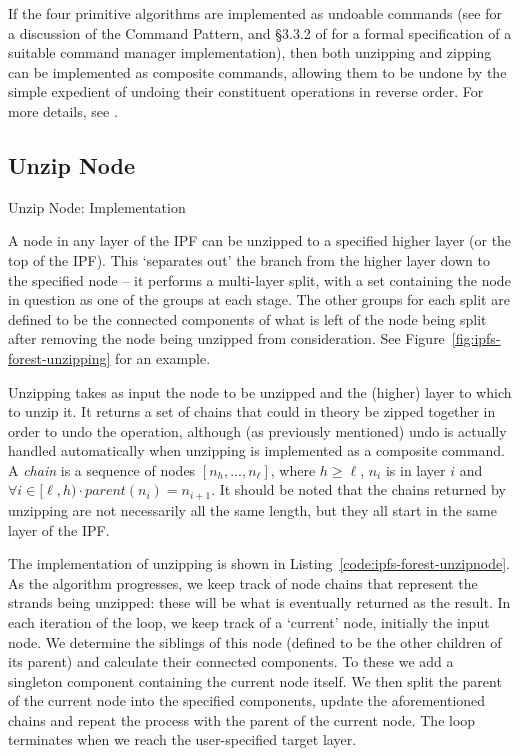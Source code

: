 \documentclass[10pt,twocolumn,twoside]{IEEEtran}
\begin{document}
If the four primitive algorithms are implemented as undoable commands (see \cite{gamma95} for a discussion of the Command Pattern, and \S3.3.2 of \cite{golodetz06} for a formal specification of a suitable command manager implementation), then both unzipping and zipping can be implemented as composite commands, allowing them to be undone by the simple expedient of undoing their constituent operations in reverse order. For more details, see \cite{golodetz11}.

\subsection{Unzip Node}

\begin{stulisting}[t]
\caption{Unzip Node: Implementation}
\label{code:ipfs-forest-unzipnode}

\end{stulisting}

A node in any layer of the IPF can be unzipped to a specified higher layer (or the top of the IPF). This `separates out' the branch from the higher layer down to the specified node -- it performs a multi-layer split, with a set containing the node in question as one of the groups at each stage. The other groups for each split are defined to be the connected components of what is left of the node being split after removing the node being unzipped from consideration. See Figure~\ref{fig:ipfs-forest-unzipping} for an example.

Unzipping takes as input the node to be unzipped and the (higher) layer to which to unzip it. It returns a set of chains that could in theory be zipped together in order to undo the operation, although (as previously mentioned) undo is actually handled automatically when unzipping is implemented as a composite command. A \emph{chain} is a sequence of nodes $[n_h,...,n_\ell]$, where $h \ge \ell$, $n_i$ is in layer $i$ and $\forall i \in [\ell,h) \cdot parent(n_i) = n_{i+1}$. It should be noted that the chains returned by unzipping are not necessarily all the same length, but they all start in the same layer of the IPF.

The implementation of unzipping is shown in Listing~\ref{code:ipfs-forest-unzipnode}. As the algorithm progresses, we keep track of node chains that represent the strands being unzipped: these will be what is eventually returned as the result. In each iteration of the loop, we keep track of a `current' node, initially the input node. We determine the siblings of this node (defined to be the other children of its parent) and calculate their connected components. To these we add a singleton component containing the current node itself. We then split the parent of the current node into the specified components, update the aforementioned chains and repeat the process with the parent of the current node. The loop terminates when we reach the user-specified target layer.
\end{document}
